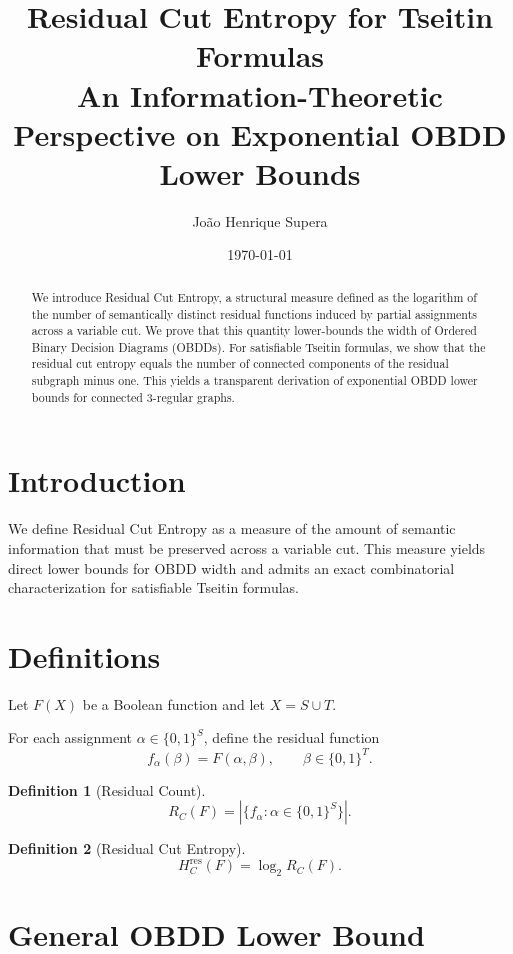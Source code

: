 \documentclass[11pt]{article}
\title{
Residual Cut Entropy for Tseitin Formulas\\
\large An Information-Theoretic Perspective on Exponential OBDD Lower Bounds
}
\author{João Henrique Supera}
\date{\today}
\newtheorem{definition}{Definition}
\newcommand{\RCE}{H^{\mathrm{res}}}
\begin{document}
\maketitle

\begin{abstract}
We introduce Residual Cut Entropy, a structural measure defined as the logarithm of the number of semantically distinct residual functions induced by partial assignments across a variable cut. We prove that this quantity lower-bounds the width of Ordered Binary Decision Diagrams (OBDDs). For satisfiable Tseitin formulas, we show that the residual cut entropy equals the number of connected components of the residual subgraph minus one. This yields a transparent derivation of exponential OBDD lower bounds for connected 3-regular graphs.
\end{abstract}

\section{Introduction}

We define Residual Cut Entropy as a measure of the amount of semantic information that must be preserved across a variable cut. This measure yields direct lower bounds for OBDD width and admits an exact combinatorial characterization for satisfiable Tseitin formulas.

\section{Definitions}

Let $F(X)$ be a Boolean function and let $X=S \cup T$.

For each assignment $\alpha \in \{0,1\}^S$, define the residual function
\[
f_\alpha(\beta)=F(\alpha,\beta), \qquad \beta \in \{0,1\}^T.
\]

\begin{definition}[Residual Count]
\[
R_C(F)=\left|\{f_\alpha : \alpha \in \{0,1\}^S\}\right|.
\]
\end{definition}

\begin{definition}[Residual Cut Entropy]
\[
\RCE_C(F)=\log_2 R_C(F).
\]
\end{definition}

\section{General OBDD Lower Bound}
\end{document}

